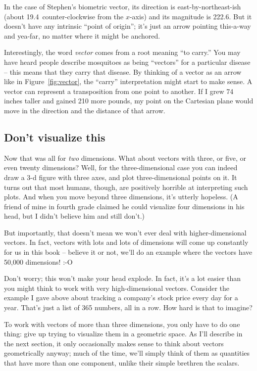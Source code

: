 
In the case of Stephen's biometric vector, its direction is
east-by-northeast-ish (about 19.4\textdegree\ counter-clockwise from the
$x$-axis) and its magnitude is 222.6. But it doesn't have any intrinsic ``point
of origin''; it's just an arrow pointing this-a-way and yea-far, no matter
where it might be anchored.


Interestingly, the word \textit{vector} comes from a root meaning ``to carry.''
You may have heard people describe mosquitoes as being ``vectors'' for a
particular disease -- this means that they carry that disease. By thinking of a
vector as an arrow like in Figure~\ref{fig:vector}, the ``carry''
interpretation might start to make sense. A vector can represent a
transposition from one point to another. If I grew 74 inches taller and gained
210 more pounds, my point on the Cartesian plane would move in the direction
and the distance of that arrow.

\subsection{Don't visualize this}

Now that was all for \textit{two} dimensions. What about vectors with three, or
five, or even twenty dimensions? Well, for the three-dimensional case you can
indeed draw a 3-d figure with three axes, and plot three-dimensional points on
it. It turns out that most humans, though, are positively horrible at
interpreting such plots. And when you move beyond three dimensions, it's
utterly hopeless. (A friend of mine in fourth grade claimed he could visualize
four dimensions in his head, but I didn't believe him and still don't.)

But importantly, that doesn't mean we won't ever deal with higher-dimensional
vectors. In fact, vectors with lots and lots of dimensions will come up
constantly for us in this book -- believe it or not, we'll do an example where
the vectors have 50,000 dimensions! :-O

Don't worry; this won't make your head explode. In fact, it's a lot easier than
you might think to work with very high-dimensional vectors. Consider the
example I gave above about tracking a company's stock price every day for a
year. That's just a list of 365 numbers, all in a row. How hard is that to
imagine?

To work with vectors of more than three dimensions, you only have to do one
thing: give up trying to visualize them in a geometric space. As I'll describe
in the next section, it only occasionally makes sense to think about vectors
geometrically anyway; much of the time, we'll simply think of them as
quantities that have more than one component, unlike their simple brethren the
scalars.

